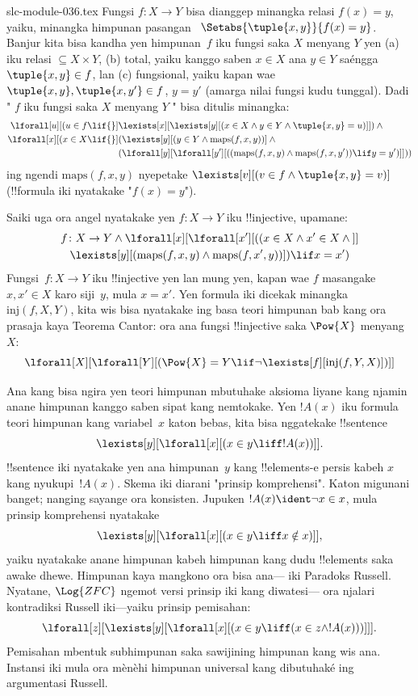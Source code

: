 \begin{filecontents*}[overwrite]{slc-module-036.tex}
Fungsi $f \colon X \to Y$ bisa dianggep minangka
relasi $f(x) = y$, yaiku, minangka himpunan pasangan~
$\Setabs{\tuple{x,y}}{f(x) = y}$. Banjur kita bisa
kandha yen himpunan~$f$ iku fungsi saka $X$ menyang
$Y$ yen (a) iku relasi
$\subseteq X \times Y$, (b) total, yaiku
kanggo saben $x \in X$ ana $y \in Y$ saéngga
$\tuple{x, y} \in f$, lan (c) fungsional,
yaiku kapan wae $\tuple{x, y}, \tuple{x, y'} \in f$,
$y = y'$ (amarga nilai fungsi kudu tunggal).
Dadi " $f$ iku fungsi saka $X$ menyang $Y$ "
bisa ditulis minangka:
\begin{align*}
 \lforall[u][(u \in f \lif {}] & \lexists[x][\lexists[y][(x \in X \land y \in
      Y \land \tuple{x, y} = u)]]) \land {}\\
 \lforall[x][(x \in X \lif {}] &
      (\lexists[y][(y \in Y \land \mathrm{maps}(f, x, y))] \land {}\\
& (\lforall[y][\lforall[y'][((\mathrm{maps}(f, x, y) \land
    \mathrm{maps}(f, x, y')) \lif y = y')]]))
\end{align*}
ing ngendi $\mathrm{maps}(f, x, y)$ nyepetake
$\lexists[v][(v \in f \land
  \tuple{x, y} = v)]$ (!!{formula} iki
nyatakake "$f(x) = y$").

Saiki uga ora angel nyatakake yen
$f\colon X \to Y$ iku !!{injective}, upamane:
\begin{multline*}
 f \colon X \to Y \land \lforall[x][\lforall[x'][((x \in X \land x' \in
     X \land {}]] \\
 \lexists[y][(\mathrm{maps}(f, x, y) \land \mathrm{maps}(f,
        x', y))]) \lif x = x')
\end{multline*}
Fungsi~$f\colon X \to Y$ iku !!{injective}
yen lan mung yen, kapan wae $f$ masangake
$x, x' \in X$ karo siji~$y$, mula $x = x'$.
Yen formula iki dicekak minangka
$\mathrm{inj}(f, X, Y)$, kita wis bisa
nyatakake ing basa teori himpunan bab kang
ora prasaja kaya Teorema Cantor:
ora ana fungsi !!{injective} saka $\Pow{X}$
menyang $X$:
\[
\lforall[X][\lforall[Y][(\Pow{X} = Y \lif
    \lnot\lexists[f][\mathrm{inj}(f, Y, X)])]]
\]

Ana kang bisa ngira yen teori himpunan mbutuhake
aksioma liyane kang njamin anane himpunan kanggo
saben sipat kang nemtokake. Yen $!A(x)$ iku formula
teori himpunan kang variabel~$x$ katon bebas,
kita bisa nggatekake !!{sentence}
\[
\lexists[y][\lforall[x][(x \in y \liff !A(x))]].
\]
!!{sentence} iki nyatakake yen ana himpunan~$y$
kang !!{element}s-e persis kabeh $x$ kang
nyukupi~$!A(x)$. Skema iki diarani
"prinsip komprehensi". Katon migunani banget;
nanging sayange ora konsisten. Jupuken
$!A(x) \ident \lnot x \in x$, mula prinsip
komprehensi nyatakake
\[
\lexists[y][\lforall[x][(x \in y \liff x \notin x)]],
\]
yaiku nyatakake anane himpunan kabeh himpunan
kang dudu !!{element}s saka awake dhewe.
Himpunan kaya mangkono ora bisa ana---
iki Paradoks Russell. Nyatane, $\Log{ZFC}$
ngemot versi prinsip iki kang diwatesi---
ora njalari kontradiksi Russell iki---yaiku prinsip pemisahan:
\[
\lforall[z][\lexists[y][\lforall[x][(x \in y \liff (x \in z \land
      !A(x)))]]].
\]
 Pemisahan mbentuk subhimpunan saka sawijining himpunan kang wis ana. Instansi iki mula ora mènèhi himpunan universal kang dibutuhaké ing argumentasi Russell.


\end{filecontents*}
